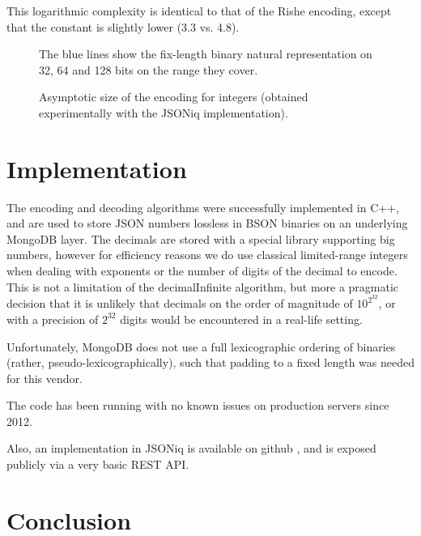 \documentclass{acm_proc_article-sp}
\begin{document}
This logarithmic complexity is identical to that of the Rishe encoding, except that the constant is slightly lower (3.3 vs. 4.8).


\begin{figure}
\label{figure-size}
\caption{Asymptotic size of the encoding for integers (obtained experimentally with the JSONiq implementation).}
The blue lines show the fix-length binary natural representation on 32, 64 and 128 bits on the range they cover.

\end{figure}

\section{Implementation}
\label{section-implementation}
The encoding and decoding algorithms were successfully implemented in C++, and are used to store JSON numbers lossless in BSON binaries on an underlying MongoDB layer. The decimals are stored with a special library supporting big numbers, however for efficiency reasons we do use classical limited-range integers when dealing with exponents or the number of digits of the decimal to encode. This is not a limitation of the decimalInfinite algorithm, but more a pragmatic decision that it is unlikely that decimals on the order of magnitude of $10^{2^{32}}$, or with a precision of $2^{32}$ digits would be encountered in a real-life setting.

Unfortunately, MongoDB does not use a full lexicographic ordering of binaries (rather, pseudo-lexicographically), such that padding to a fixed length was needed for this vendor.

The code has been running with no known issues on production servers since 2012.

Also, an implementation in JSONiq is available on github \cite{decimalInfiniteJSONiq}, and is exposed publicly via a very basic REST API.

\section{Conclusion}
\end{document}
